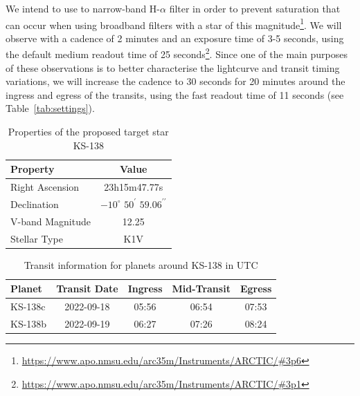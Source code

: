 \documentclass[twocolumn]{aastex631}
\begin{document}
We intend to use to narrow-band H-$\alpha$ filter in order to prevent saturation that can occur when using broadband filters with a star of this magnitude\footnote{\url{https://www.apo.nmsu.edu/arc35m/Instruments/ARCTIC/\#3p6}}. We will observe with a cadence of 2 minutes and an exposure time of 3-5 seconds, using the default medium readout time of 25 seconds\footnote{\url{https://www.apo.nmsu.edu/arc35m/Instruments/ARCTIC/\#3p1}}. Since one of the main purposes of these observations is to better characterise the lightcurve and transit timing variations, we will increase the cadence to 30 seconds for 20 minutes around the ingress and egress of the transits, using the fast readout time of 11 seconds (see Table~\ref{tab:settings}).

\begin{table}[htb]
    \centering
    \begin{tabular}{l|c} 
        \hline
        Property & Value \\
        \hline\hline
        Right Ascension & 23h15m47.77s \\
        Declination & $-10^\circ$ $50^\prime$ $59.06^{\prime\prime}$ \\
        V-band Magnitude & 12.25 \\
        Stellar Type & K1V \\
        \hline
    \end{tabular}
    \caption{Properties of the proposed target star KS-138}
    \label{tab:star}
\end{table}

\begin{table}[htb]
    \centering
    \begin{tabular}{l|c|c|c|c} 
        \hline
        Planet & Transit Date & Ingress & Mid-Transit & Egress \\
        \hline\hline
        KS-138c & 2022-09-18 & 05:56 & 06:54 & 07:53 \\
        KS-138b & 2022-09-19 & 06:27 & 07:26 & 08:24 \\
        \hline
    \end{tabular}
    \caption{Transit information for planets around KS-138 in UTC}
    \label{tab:transits}
\end{table}
\end{document}
